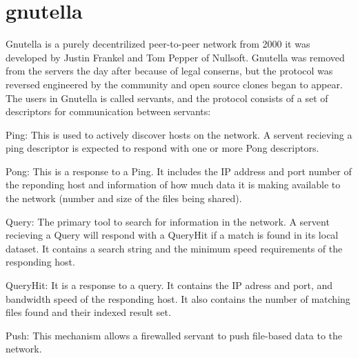 

\label{sec:gnutella}
\section{gnutella}
Gnutella is a purely decentrilized peer-to-peer network from 2000 it was developed by Justin Frankel and Tom Pepper of Nullsoft. Gnutella was removed from the servers the day after because of legal conserns, but the protocol was reversed engineered by the community and open source clones began to appear.
The users in Gnutella is called servants, and the protocol consists of a set of descriptors for communication between servants:
\begin{enummerate}
\item Ping: This is used to actively discover hosts on the network. A servent recieving a ping descriptor is expected to respond with one or more Pong descriptors.
\item Pong: This is a response to a Ping. It includes the IP address and port number of the reponding host and information of how much data it is making available to the network (number and size of the files being shared).
\item Query: The primary tool to search for information in the network. A servent recieving a Query will respond with a QueryHit if a match is found in its local dataset. It contains a search string and the minimum speed requirements of the responding host.
\item QueryHit: It is a response to a query. It contains the IP adress and port, and bandwidth speed of the responding host. It also contains the number of matching files found and their indexed result set.
\item Push: This mechanism allows a firewalled servant to push file-based data to the network.
\end{enummerate}

